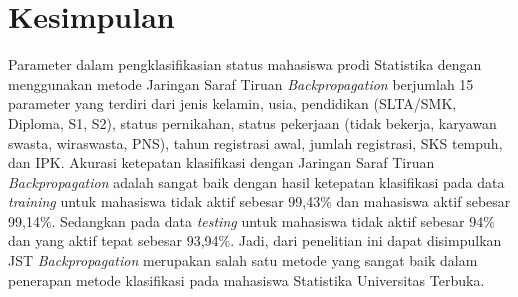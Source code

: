 \section{Kesimpulan}


Parameter dalam pengklasifikasian status mahasiswa prodi Statistika dengan menggunakan metode Jaringan Saraf Tiruan \textit{Backpropagation} berjumlah 15 parameter yang terdiri dari jenis kelamin, usia, pendidikan (SLTA/SMK, Diploma, S1, S2), status pernikahan, status pekerjaan (tidak bekerja, karyawan swasta, wiraswasta, PNS), tahun registrasi awal, jumlah registrasi, SKS tempuh, dan IPK. Akurasi ketepatan klasifikasi dengan Jaringan Saraf Tiruan \textit{Backpropagation} adalah sangat baik dengan hasil ketepatan klasifikasi pada data \textit{training} untuk mahasiswa tidak aktif sebesar 99,43\% dan mahasiswa aktif sebesar 99,14\%. Sedangkan pada data \textit{testing} untuk mahasiswa tidak aktif sebesar 94\% dan yang aktif tepat sebesar 93,94\%. Jadi, dari penelitian ini dapat disimpulkan JST \textit{Backpropagation} merupakan salah satu metode yang sangat baik dalam penerapan metode klasifikasi pada mahasiswa Statistika Universitas Terbuka.